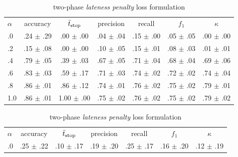 \documentclass[%
  aspectratio=169,
  9pt,
  USenglish,
  titlegraphic, %
  progressbar,
]{beamer}
\begin{document}
\begin{frame}

	
	\begin{table}
		\caption{Varying the weighting factor $\alpha$ for the two loss formulations \emph{early reward} (\cref{sec:earlynessreward}) and \emph{lateness penalty} (\cref{sec:twophasecrossentropy}).}
		\label{tab:alpha}
		
		\setlength{\belowcaptionskip}{0pt}
		
		\begin{subtable}{.5\textwidth}
			\scriptsize
			\hspace{0em}\begin{tabular}{lcccccc}
				\toprule
				\textbf{$\alpha$} & accuracy & $\bar{t}_\text{stop}$ & precision & recall & $f_1$ & $\kappa$ \\
				\cmidrule(lr){0-0}\cmidrule(lr){1-1}\cmidrule(lr){2-2}\cmidrule(lr){3-3}\cmidrule(lr){4-4}\cmidrule(lr){5-5}\cmidrule(lr){6-6}\cmidrule(lr){7-7}
				.0 & .24 $\pm$ .29 & .00 $\pm$ .00 & .04 $\pm$ .04 & .15 $\pm$ .00 & .05 $\pm$ .05 & .00 $\pm$ .00 \\
				.2 & .15 $\pm$ .08 & .00 $\pm$ .00 & .10 $\pm$ .05 & .15 $\pm$ .01 & .08 $\pm$ .03 & .01 $\pm$ .01 \\
				.4 & .79 $\pm$ .05 & .39 $\pm$ .03 & .67 $\pm$ .05 & .71 $\pm$ .04 & .68 $\pm$ .04 & .69 $\pm$ .06 \\
				.6 & .83 $\pm$ .03 & .59 $\pm$ .17 & .71 $\pm$ .03 & .74 $\pm$ .02 & .72 $\pm$ .02 & .74 $\pm$ .04 \\
				.8 & .86 $\pm$ .01 & .86 $\pm$ .12 & .74 $\pm$ .01 & .76 $\pm$ .02 & .75 $\pm$ .02 & .79 $\pm$ .01 \\
				1.0 & .86 $\pm$ .01 & 1.00 $\pm$ .00 & .75 $\pm$ .02 & .76 $\pm$ .02 & .75 $\pm$ .02 & .79 $\pm$ .02 \\
				\bottomrule
			\end{tabular}
			\caption{two-phase \emph{lateness penalty} loss formulation}
			\label{tab:alpha:xentropy}
		\end{subtable}
		\begin{subtable}{.5\textwidth}
			\scriptsize
			\hspace{0em}\begin{tabular}{lcccccc}
				\toprule\small
				\textbf{$\alpha$} & accuracy & $\bar{t}_\text{stop}$  & precision & recall & $f_1$ & $\kappa$ \\
				\cmidrule(lr){0-0}\cmidrule(lr){1-1}\cmidrule(lr){2-2}\cmidrule(lr){3-3}\cmidrule(lr){4-4}\cmidrule(lr){5-5}\cmidrule(lr){6-6}\cmidrule(lr){7-7}
				.0 & .25 $\pm$ .22 & .10 $\pm$ .17 & .19 $\pm$ .20 & .25 $\pm$ .17 & .16 $\pm$ .20 & .12 $\pm$ .19 \\

\end{tabular}
\end{subtable}
\end{table}
\end{frame}
\end{document}
